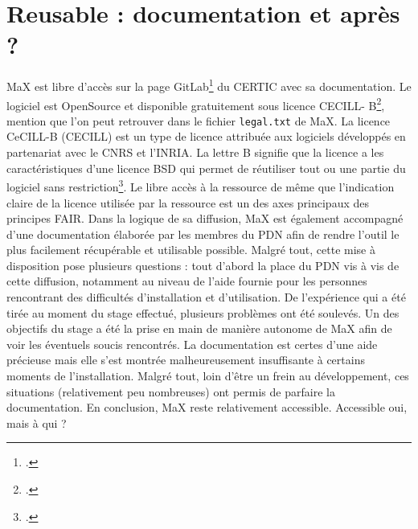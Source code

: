 \documentclass[a4paper,12pt,twoside]{book}
\begin{document}
\section{Reusable : documentation et après ?}
MaX est libre d'accès sur la page GitLab\footcite{pdn-certic} du \acrshort{CERTIC} avec sa documentation. Le logiciel est OpenSource et disponible gratuitement sous licence \acrshort{CECILL}- B\footcite{licences}, mention que l'on peut retrouver dans le fichier \texttt{legal.txt} de MaX. La licence CeCILL-B (\acrlong{CECILL}) est un type de licence attribuée aux logiciels développés en partenariat avec le \acrshort{CNRS} et l'\acrfull{INRIA}. La lettre B signifie que la licence a les caractéristiques d'une licence \acrfull{BSD} qui permet de réutiliser tout ou une partie du logiciel sans restriction\footcite{bsd}. Le libre accès à la ressource de même que l'indication claire de la licence utilisée par la ressource est un des axes principaux des principes FAIR. Dans la logique de sa diffusion, MaX est également accompagné d'une documentation élaborée par les membres du \acrshort{PDN} afin de rendre l'outil le plus facilement récupérable et utilisable possible. Malgré tout, cette mise à disposition pose plusieurs questions : tout d'abord la place du \acrshort{PDN} vis à vis de cette diffusion, notamment au niveau de l'aide fournie pour les personnes rencontrant des difficultés d'installation et d'utilisation. De l'expérience qui a été tirée au moment du stage effectué, plusieurs problèmes ont été soulevés. Un des objectifs du stage a été la prise en main de manière autonome de MaX afin de voir les éventuels soucis rencontrés. La documentation est certes d'une aide précieuse mais elle s'est montrée malheureusement insuffisante à certains moments de l'installation. Malgré tout, loin d'être un frein au développement, ces situations (relativement peu nombreuses) ont permis de parfaire la documentation. En conclusion, MaX reste relativement accessible. Accessible oui, mais à qui ?
\end{document}
